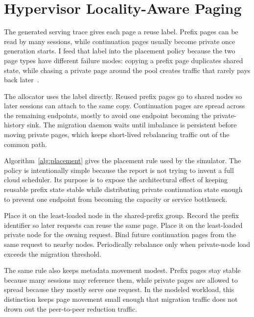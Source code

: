 \section{Hypervisor Locality-Aware Paging}

The generated serving trace gives each page a reuse label. Prefix pages can be read by many sessions, while continuation pages usually become private once generation starts. I feed that label into the placement policy because the two page types have different failure modes: copying a prefix page duplicates shared state, while chasing a private page around the pool creates traffic that rarely pays back later~\cite{splitwise}.

The allocator uses the label directly. Reused prefix pages go to shared nodes so later sessions can attach to the same copy. Continuation pages are spread across the remaining endpoints, mostly to avoid one endpoint becoming the private-history sink. The migration daemon waits until imbalance is persistent before moving private pages, which keeps short-lived rebalancing traffic out of the common path.

Algorithm~\ref{alg:placement} gives the placement rule used by the simulator. The policy is intentionally simple because the report is not trying to invent a full cloud scheduler. Its purpose is to expose the architectural effect of keeping reusable prefix state stable while distributing private continuation state enough to prevent one endpoint from becoming the capacity or service bottleneck.

\begin{algorithm}[htbp]
\caption{Locality-aware KV-page placement}
\label{alg:placement}
\begin{algorithmic}[1]
        \STATE Place it on the least-loaded node in the shared-prefix group.
        \STATE Record the prefix identifier so later requests can reuse the same page.
    \ELSE
        \STATE Place it on the least-loaded private node for the owning request.
        \STATE Bind future continuation pages from the same request to nearby nodes.
    \ENDIF
\ENDFOR
\STATE Periodically rebalance only when private-node load exceeds the migration threshold.
\end{algorithmic}
\end{algorithm}

The same rule also keeps metadata movement modest. Prefix pages stay stable because many sessions may reference them, while private pages are allowed to spread because they mostly serve one request. In the modeled workload, this distinction keeps page movement small enough that migration traffic does not drown out the peer-to-peer reduction traffic.

